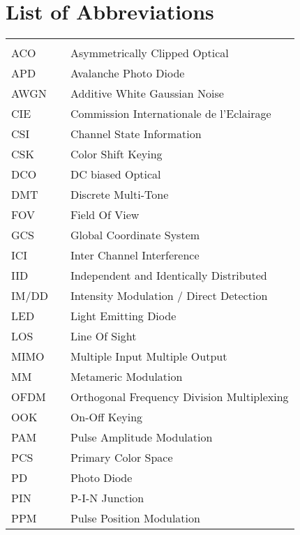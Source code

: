 \chapter*{List of Abbreviations}
\begin{center}
  \begin{longtable}{lll}
    \hspace*{2em} & \hspace*{1in} & \hspace*{4.5in} \\
    ACO & \dotfill & Asymmetrically Clipped Optical \\
		APD & \dotfill & Avalanche Photo Diode \\
		AWGN & \dotfill & Additive White Gaussian Noise \\
		CIE & \dotfill & Commission Internationale de l'Eclairage \\
		CSI & \dotfill & Channel State Information \\
		CSK & \dotfill & Color Shift Keying \\
		DCO & \dotfill & DC biased Optical \\
		DMT & \dotfill & Discrete Multi-Tone \\
		FOV & \dotfill & Field Of View \\
		GCS & \dotfill & Global Coordinate System \\
		ICI & \dotfill & Inter Channel Interference \\
		IID & \dotfill & Independent and Identically Distributed \\
		IM/DD & \dotfill & Intensity Modulation / Direct Detection \\
		LED & \dotfill & Light Emitting Diode \\
		LOS & \dotfill & Line Of Sight \\
		MIMO & \dotfill & Multiple Input Multiple Output \\
		MM & \dotfill & Metameric Modulation \\
		OFDM  & \dotfill & Orthogonal Frequency Division Multiplexing \\
		OOK & \dotfill & On-Off Keying \\
		PAM & \dotfill & Pulse Amplitude Modulation \\
		PCS & \dotfill & Primary Color Space \\
		PD & \dotfill & Photo Diode \\
		PIN & \dotfill & P-I-N Junction \\
		PPM & \dotfill & Pulse Position Modulation \\

\end{longtable}
\end{center}

